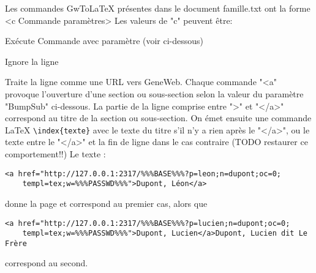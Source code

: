 Les commandes GwToLaTeX présentes dans le document famille.txt ont la forme
<c Commande paramètres>
Les valeurs de "c" peuvent être:
\begin{description}[style=nextline]
\item[x] Exécute Commande avec paramètre (voir ci-dessous)
\item[y] Ignore la ligne
\item[a] Traite la ligne comme une URL vers GeneWeb. 
Chaque commande "<a" provoque l'ouverture d'une section ou sous-section selon
la valeur du paramètre "BumpSub" ci-dessous. La partie de la ligne comprise entre
">" et "</a>" correspond au titre de la section ou sous-section.
On émet ensuite une commande LaTeX \verb|\index{texte}| avec le texte du titre s'il
n'y a rien après le "</a>", ou le texte entre le "</a>" et la fin de ligne
dans le cas contraire (TODO restaurer ce comportement!!)
Le texte :
\begin{verbatim}
<a href="http://127.0.0.1:2317/%%%BASE%%%?p=leon;n=dupont;oc=0;
    templ=tex;w=%%%PASSWD%%%">Dupont, Léon</a>
\end{verbatim}
donne la page \pageref{section1} et correspond au premier cas, alors que 
\begin{verbatim}
<a href="http://127.0.0.1:2317/%%%BASE%%%?p=lucien;n=dupont;oc=0;
    templ=tex;w=%%%PASSWD%%%">Dupont, Lucien</a>Dupont, Lucien dit Le Frère
\end{verbatim}
correspond au second.
\end{description}

